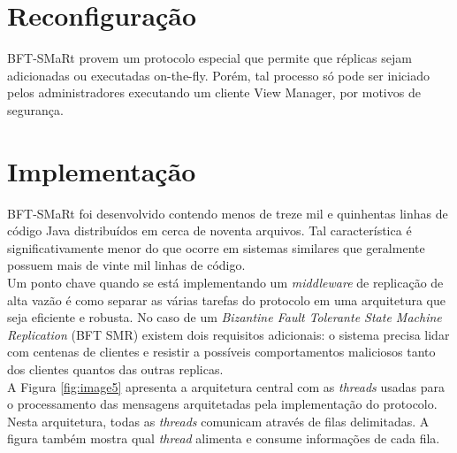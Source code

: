 	\section{Reconfiguração}
	BFT-SMaRt provem um protocolo especial que permite que réplicas sejam adicionadas ou executadas on-the-fly. Porém, tal processo só pode ser iniciado pelos administradores executando um cliente View Manager, por motivos de segurança.\\
	
	\section{Implementação}
	BFT-SMaRt foi desenvolvido contendo menos de treze mil e quinhentas linhas de código Java distribuídos em cerca de noventa arquivos. Tal característica é significativamente menor do que ocorre em sistemas similares que geralmente possuem mais de vinte mil linhas de código. \\
	
	Um ponto chave quando se está implementando um \textit{middleware} de replicação de alta vazão é como separar as várias tarefas do protocolo em uma arquitetura que seja eficiente e robusta. No caso de um \textit{Bizantine Fault Tolerante State Machine Replication} (BFT SMR) existem dois requisitos adicionais: o sistema precisa lidar com centenas de clientes e resistir a possíveis comportamentos maliciosos tanto dos clientes quantos das outras replicas.\\
	
	A Figura \ref{fig:image5} apresenta a arquitetura central com as \textit{threads}  usadas para o processamento das mensagens arquitetadas pela implementação do protocolo. Nesta arquitetura, todas as \textit{threads} comunicam através de filas delimitadas. A figura também mostra qual \textit{thread} alimenta e consume informações de cada fila. \\  
	

